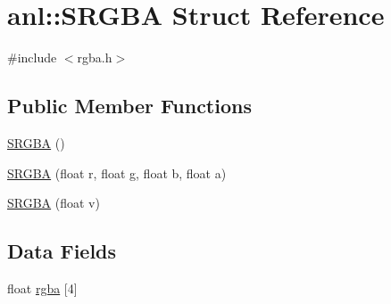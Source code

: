 \hypertarget{structanl_1_1SRGBA}{
\section{anl::SRGBA Struct Reference}
\label{structanl_1_1SRGBA}
}


{\ttfamily \#include $<$rgba.h$>$}\subsection*{Public Member Functions}
\begin{DoxyCompactItemize}
\item 
\hyperlink{structanl_1_1SRGBA_a36c6e2b0d09b52558847b97248ed7b87}{SRGBA} ()
\item 
\hyperlink{structanl_1_1SRGBA_acea341abcd19bb068dfd85ffee77899c}{SRGBA} (float r, float g, float b, float a)
\item 
\hyperlink{structanl_1_1SRGBA_a1304b087913212baac85d0511636c9d7}{SRGBA} (float v)
\end{DoxyCompactItemize}
\subsection*{Data Fields}
\begin{DoxyCompactItemize}
\item 
float \hyperlink{structanl_1_1SRGBA_ac3ed4480953fb956b1f3ba41868567ff}{rgba} \mbox{[}4\mbox{]}
\end{DoxyCompactItemize}



